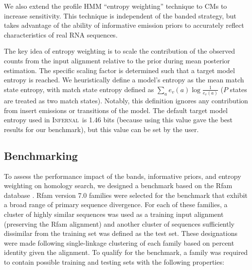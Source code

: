 \documentclass[11pt]{article}
\def\infernal{\textsc{Infernal}~}
\begin{document}
We also extend the profile HMM ``entropy weighting'' technique to CMs
to increase sensitivity.
This technique is independent of the banded strategy, but takes
advantage of the ability of informative emission priors to
accurately reflect characteristics of real RNA sequences. 

The key idea of entropy weighting is to scale the contribution of the
observed counts from the input alignment relative to the prior during
mean posterior estimation. The specific scaling factor is
determined such that a target model entropy is reached.
We heuristically define a model's entropy 
as the mean match state entropy, with match state entropy defined as 
$\sum_a e_v(a) \log \frac{1}{e_v(a)}$ ($P$ states are treated as two
match states). Notably, this definition ignores any contribution from
insert emissions or transitions of the model. 
The default target model entropy used in \infernal is 1.46 bits
(because using this value gave the best results for our benchmark), but
this value can be set by the user. 

\subsection{Benchmarking}

To assess the performance impact of the bands, informative priors, and
entropy weighting on homology search, we designed a 
benchmark based on the Rfam database \cite{Griffiths-Jones05}. Rfam
version 7.0 families were selected for the benchmark that
exhibit a broad range of primary sequence divergence. For each of
these families, a cluster of highly similar sequences was 
used as a training input alignment (preserving the Rfam alignment)
and another cluster of sequences sufficiently dissimilar from the
training set was defined as the test set. 
These designations were made following single-linkage clustering of each
family based on percent identity given the alignment. To qualify for
the benchmark, a family was required to contain possible training and
testing sets with the following properties:
\end{document}
